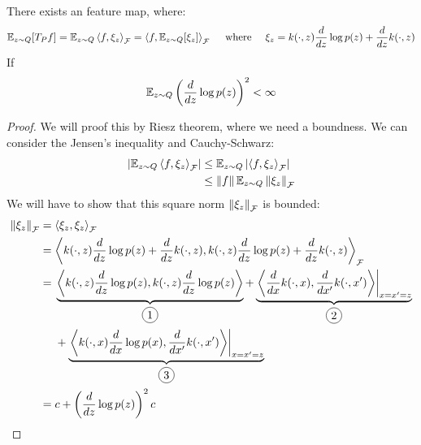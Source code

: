 \begin{theorem}
    There exists an feature map, where:
    \begin{equation*}
        \mathbb{E}_{z\sim Q} [T_Pf] = \mathbb{E}_{z\sim Q}\left\langle f, \xi_z \right\rangle_\mathcal{F} = \left\langle f, \mathbb{E}_{z\sim Q}[\xi_z] \right\rangle_\mathcal{F} \quad \text{ where } \quad \xi_z = k(\cdot, z)\frac{d}{dz} \log p(z) + \frac{d}{dz} k(\cdot, z) 
    \end{equation*}
    If 
    \begin{equation*}
        \mathbb{E}_{z\sim Q}\left( \frac{d}{dz}\log p(z) \right)^2<\infty
    \end{equation*}
\end{theorem}
\begin{proof}
    We will proof this by Riesz theorem, where we need a boundness. We can consider the Jensen's inequality and Cauchy-Schwarz:
    \begin{equation*}
    \begin{aligned}
        \left| \mathbb{E}_{z\sim Q} \left\langle f, \xi_z \right\rangle_\mathcal{F} \right| &\le \mathbb{E}_{z\sim Q}\left| \left\langle f, \xi_z \right\rangle_\mathcal{F} \right| \\
        &\le \left\lVert f\right\rVert\mathbb{E}_{z\sim Q}\left\lVert\xi_z\right\rVert_\mathcal{F}
    \end{aligned}
    \end{equation*}
    We will have to show that this square norm $\left\lVert\xi_z\right\rVert_\mathcal{F}$ is bounded:
    \begin{equation*}
    \begin{aligned}
        \norm{\xi_z}_\mathcal{F} &= \brackd{\xi_z, \xi_z}_\mathcal{F} \\
        &= \brackd{k(\cdot, z)\frac{d}{dz} \log p(z) + \frac{d}{dz} k(\cdot, z) , k(\cdot, z)\frac{d}{dz} \log p(z) + \frac{d}{dz} k(\cdot, z) }_\mathcal{F} \\
        &= \begin{aligned}[t]
            &\underbrace{\brackd{k(\cdot, z)\frac{d}{dz} \log p(z), k(\cdot, z)\frac{d}{dz} \log p(z)}}_{\circled{1}}  +\underbrace{\left.\brackd{\frac{d}{dx} k(\cdot, x), \frac{d}{dx'} k(\cdot, x')}\right|_{x=x'=z}}_{\circled{2}} \\
            &+ \underbrace{\left.\brackd{k(\cdot, x)\frac{d}{dx} \log p(x), \frac{d}{dx'} k(\cdot, x')}\right|_{x=x'=z}}_{\circled{3}}
        \end{aligned} \\
        &= c + \bracka{\frac{d}{dz}\log p(z)}^2c
    \end{aligned}
    \end{equation*}

\end{proof}
